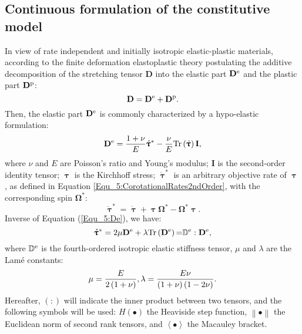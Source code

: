 \subsection{Continuous formulation of the constitutive model}
\noindent
In view of rate independent and initially isotropic elastic-plastic materials, according to the finite deformation elastoplastic theory postulating the additive decomposition of the stretching tensor ${\mathbf{D}}$ into the elastic part ${{\mathbf{D}}^{\rm{e}}}$ and the plastic part ${{\mathbf{D}}^{\rm{p}}}$:
\begin{equation}
{\mathbf{D}} = {{\mathbf{D}}^{\rm{e}}} + {{\mathbf{D}}^{\rm{p}}}.
\end{equation}
Then, the elastic part ${{\mathbf{D}}^{\rm{e}}}$ is commonly characterized by a hypo-elastic formulation:
\begin{equation}
\label{Equ_5:De}
{{\mathbf{D}}^{\rm{e}}} = \frac{{1 + \nu }}{E}{\mathring {\bm{\uptau }}^{*}} - \frac{\nu }{E}{\rm{Tr}}\left( {\dot {\bm{\uptau }}} \right){\mathbf{I}},
\end{equation}
where $\nu$ and $E$ are Poisson's ratio and Young's modulus; ${\mathbf{I}}$ is the second-order identity tensor; $\bm{\uptau}$ is the Kirchhoff stress; ${\mathring {\bm{\uptau }}^{*}}$ is an arbitrary objective rate of $\bm{\uptau}$, as defined in Equation \ref{Equ_5:CorotationalRates2ndOrder}, with the corresponding spin ${{\mathbf{\Omega }}^*}$:
\begin{equation}
{\mathring {\bm{\uptau }}^{*}} = \dot {\bm{\uptau }}  + \bm{\uptau } {{\mathbf{\Omega }}^*} - {{\mathbf{\Omega }}^*}\bm{\uptau }.
\end{equation}
Inverse of Equation (\ref{Equ_5:De}), we have:
\begin{equation}
{\mathring {\bm{\uptau }}^{*}} = 2\mu {{\mathbf{D}}^{\rm{e}}} + \lambda {\rm{Tr}}\left( {{{\mathbf{D}}^{\rm{e}}}} \right){\rm{ = }}{\mathbb{D}^{\rm{e}}}:{{\mathbf{D}}^{\rm{e}}},
\end{equation}
where ${\mathbb{D}}^{\rm{e}}$ is the fourth-ordered isotropic elastic stiffness tensor, $\mu$ and $\lambda$ are the Lam\'{e} constants:
\begin{equation}
\mu  = \frac{E}{{2\left( {1 + \nu } \right)}},{\rm{  }}\lambda  = \frac{{E\nu }}{{\left( {1 + \nu } \right)\left( {1 - 2\nu } \right)}}.
\end{equation}
Hereafter, $\left(:\right)$ will indicate the inner product between two tensors, and the following symbols will be used: $H\left(\bullet\right)$ the Heaviside step function, $\left\|\bullet\right\|$ the Euclidean norm of second rank tensors, and $\left<\bullet\right>$ the Macauley bracket.\\
